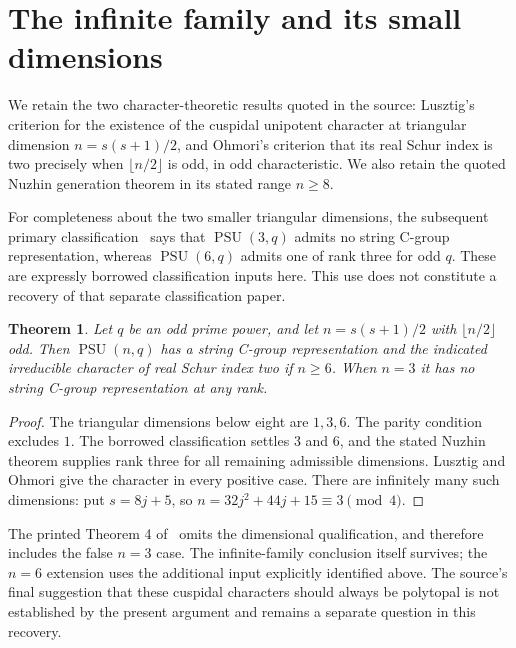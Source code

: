 \documentclass[11pt,a4paper]{article}
\newtheorem{theorem}{Theorem}
\begin{document}
\section{The infinite family and its small dimensions}
We retain the two character-theoretic results quoted in the source:
Lusztig's criterion for the existence of the cuspidal unipotent
character at triangular dimension $n=s(s+1)/2$, and Ohmori's
criterion that its real Schur index is two precisely when
$\lfloor n/2\rfloor$ is odd, in odd characteristic. We also retain
the quoted Nuzhin generation theorem in its stated range $n\ge8$.

For completeness about the two smaller triangular dimensions, the
subsequent primary classification~\cite[Theorem 1.1 and following
paragraph]{LV} says that $\operatorname{PSU}(3,q)$ admits no string
C-group representation, whereas $\operatorname{PSU}(6,q)$ admits
one of rank three for odd $q$. These are expressly borrowed
classification inputs here. This use does not constitute a recovery
of that separate classification paper.

\begin{theorem}
Let $q$ be an odd prime power, and let $n=s(s+1)/2$ with
$\lfloor n/2\rfloor$ odd. Then $\operatorname{PSU}(n,q)$ has a
string C-group representation and the indicated irreducible character
of real Schur index two if $n\ge6$. When $n=3$ it has no string
C-group representation at any rank.
\end{theorem}
\begin{proof}
The triangular dimensions below eight are $1,3,6$. The parity
condition excludes $1$. The borrowed classification settles $3$
and $6$, and the stated Nuzhin theorem supplies rank three for all
remaining admissible dimensions. Lusztig and Ohmori give the
character in every positive case. There are infinitely many such
dimensions: put $s=8j+5$, so $n=32j^2+44j+15\equiv3\pmod4$.
\end{proof}

The printed Theorem 4 of~\cite{CHL} omits the dimensional
qualification, and therefore includes the false $n=3$ case. The
infinite-family conclusion itself survives; the $n=6$ extension uses
the additional input explicitly identified above. The source's final
suggestion that these cuspidal characters should always be polytopal
is not established by the present argument and remains a separate
question in this recovery.
\end{document}

